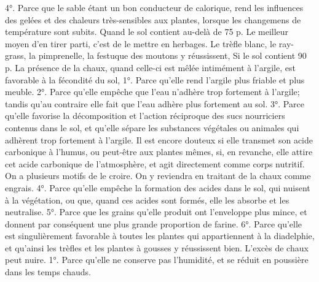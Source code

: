 4°. Parce que le sable étant un bon conducteur de calorique, rend les influences des gelées et des chaleurs très-sensibles aux plantes, lorsque les changemens de température sont subits.
Quand le sol contient au-delà de 75 p. %
Le meilleur moyen d'en tirer parti, c'est de le mettre en herbages. Le trèfle blanc, le ray-grass, la pimprenelle, la festuque des moutons y réussissent,\setcounter{page}{120} Si le sol contient 90 p.%
La présence de la chaux, quand celle-ci est mêlée intimément à l'argile, est favorable à la fécondité du sol,
1°. Parce qu'elle rend l'argile plus friable et plus meuble.
2°. Parce qu'elle empêche que l'eau n'adhère trop fortement à l'argile; tandis qu'au contraire elle fait que l'eau adhère plus fortement au sol.
3°. Parce qu'elle favorise la décomposition et l'action réciproque des sucs nourriciers contenus dans le sol, et qu'elle sépare les substances végétales ou animales\setcounter{page}{121} qui adhèrent trop fortement à l'argile. Il est encore douteux si elle transmet son acide carbonique à l'humus, ou peut-être aux plantes mêmes, si, en revanche, elle attire cet acide carbonique de l'atmosphère, et agit directement comme corps nutritif. On a plusieurs motifs de le croire. On y reviendra en traitant de la chaux comme engrais.
4°. Parce qu'elle empêche la formation des acides dans le sol, qui nuisent à la végétation, ou que, quand ces acides sont formés, elle les absorbe et les neutralise.
5°. Parce que les grains qu'elle produit ont l'enveloppe plus mince, et donnent par conséquent une plus grande proportion de farine.
6°. Parce qu'elle est singulièrement favorable à toutes les plantes qui appartiennent à la diadelphie, et qu'ainsi les trèfles et les plantes à gousses y réussissent bien.
L'excès de chaux peut nuire.
1°. Parce qu'elle ne conserve pas l'humidité, et se réduit en poussière dans les temps chauds.
